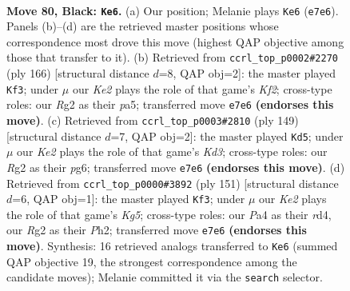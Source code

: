 \documentclass[11pt]{article}
\begin{document}
\clearpage

\begin{figure}[p]\centering
\begin{subfigure}{0.46\textwidth}\centering
\resizebox{\linewidth}{!}{%
\newchessgame
\chessboard[
  setfen={8/4k3/8/2p5/p2p1K2/8/6r1/8 b - - 1 80},
  showmover=false,
  pgfstyle=straightmove, color=movearrow, markmove={e7-e6}
]}
\caption{}
\end{subfigure}\hfill
\begin{subfigure}{0.46\textwidth}\centering
\resizebox{\linewidth}{!}{%
\newchessgame
\chessboard[
  setfen={8/8/8/pP1k1p2/P7/8/5K2/8 w - - 12 84},
  showmover=false,
  pgfstyle=straightmove, color=movearrow, markmove={f2-f3}
]}
\caption{}
\end{subfigure}
\\[4pt]
\begin{subfigure}{0.46\textwidth}\centering
\resizebox{\linewidth}{!}{%
\newchessgame
\chessboard[
  setfen={8/6p1/3k2Pp/8/5K2/8/1P6/8 b - - 2 75},
  showmover=false,
  pgfstyle=straightmove, color=movearrow, markmove={d6-d5}
]}
\caption{}
\end{subfigure}\hfill
\begin{subfigure}{0.46\textwidth}\centering
\resizebox{\linewidth}{!}{%
\newchessgame
\chessboard[
  setfen={8/5p2/2K3p1/8/3R2k1/8/7p/8 b - - 3 76},
  showmover=false,
  pgfstyle=straightmove, color=movearrow, markmove={g4-f3}
]}
\caption{}
\end{subfigure}
\caption{\textbf{Move 80, Black: \texttt{Ke6}.} (a) Our position; Melanie plays \texttt{Ke6} (\texttt{e7e6}). Panels (b)--(d) are the retrieved master positions whose correspondence most drove this move (highest QAP objective among those that transfer to it). (b) Retrieved from \texttt{ccrl\_top\_p0002\#2270} (ply 166) [structural distance $d$=8, QAP obj=2]: the master played \texttt{Kf3}; under $\mu$ our \emph{Ke2} plays the role of that game's \emph{Kf2}; cross-type roles: our \emph{R}g2 as their \emph{p}a5; transferred move \texttt{e7e6} \textbf{(endorses this move)}. (c) Retrieved from \texttt{ccrl\_top\_p0003\#2810} (ply 149) [structural distance $d$=7, QAP obj=2]: the master played \texttt{Kd5}; under $\mu$ our \emph{Ke2} plays the role of that game's \emph{Kd3}; cross-type roles: our \emph{R}g2 as their \emph{p}g6; transferred move \texttt{e7e6} \textbf{(endorses this move)}. (d) Retrieved from \texttt{ccrl\_top\_p0000\#3892} (ply 151) [structural distance $d$=6, QAP obj=1]: the master played \texttt{Kf3}; under $\mu$ our \emph{Ke2} plays the role of that game's \emph{Kg5}; cross-type roles: our \emph{P}a4 as their \emph{r}d4, our \emph{R}g2 as their \emph{P}h2; transferred move \texttt{e7e6} \textbf{(endorses this move)}. Synthesis: 16 retrieved analogs transferred to \texttt{Ke6} (summed QAP objective 19, the strongest correspondence among the candidate moves); Melanie committed it via the \texttt{search} selector.}
\label{fig:thought-m159}
\end{figure}
\end{document}
